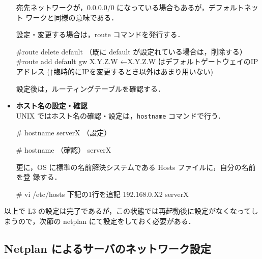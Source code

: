 \begin{itemize}
宛先ネットワークが，0.0.0.0/0 になっている場合もあるが，デフォルトネット
     ワークと同様の意味である．

設定・変更する場合は，route コマンドを発行する．
\begin{cli}
#route delete default （既に default が設定れている場合は，削除する）
#route add default gw X.Y.Z.W  ←X.Y.Z.W はデフォルトゲートウェイのIPアドレス
(↑臨時的にIPを変更するとき以外はあまり用いない)
\end{cli}

設定後は，ルーティングテーブルを確認する．

\item{\bf ホスト名の設定・確認}\\
UNIX ではホスト名の確認・設定は，\texttt{hostname} コマンドで行う．
\begin{cli}
# hostname serverX  （設定）
\end{cli}
\begin{cli}
# hostname  （確認）
serverX
\end{cli}

更に，OS に標準の名前解決システムである Hosts ファイルに，自分の名前を登
録する．

\begin{cli}
# vi /etc/hosts
 下記の1行を追記
192.168.0.X2            serverX

\end{cli}

\end{itemize}

以上で L3 の設定は完了であるが，この状態では再起動後に設定がなくなってし
まうので，次節の netplan にて設定をしておく必要がある．

\subsection{Netplan によるサーバのネットワーク設定}

